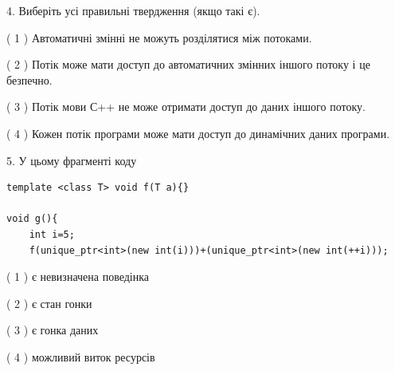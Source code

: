 \documentclass[12pt, ukrainian]{article}
\begin{document}
\begin {large}
{%
4. Виберіть усі правильні твердження (якщо такі є).\par
\vspace{2mm}

( 1 ) Автоматичні змінні не можуть розділятися між потоками.%

( 2 ) Потік може мати доступ до автоматичних змінних іншого потоку і це безпечно.%

( 3 ) Потік мови С++ не може отримати доступ до даних іншого потоку.%

( 4 ) Кожен потік програми може мати доступ до динамічних даних програми.%


5. У цьому фрагменті коду
\begin{verbatim}
template <class T> void f(T a){}

void g(){
    int i=5;
    f(unique_ptr<int>(new int(i)))+(unique_ptr<int>(new int(++i)));
\end{verbatim}
( 1 ) є невизначена поведінка%

( 2 ) є стан гонки%

( 3 ) є гонка даних%

( 4 ) можливий виток ресурсів%
}
\end {large}
\end{document}
